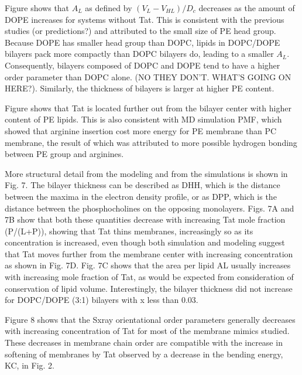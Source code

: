 \documentclass[12pt,letterpaper]{article}
\begin{document}
Figure shows that $A_L$ as defined by $(V_L-V_{HL})/D_c$ decreases as the 
amount of DOPE increases for systems without Tat. This is consistent with the
previous studies (or predictions?) and attributed to the small size of PE
head group. Because DOPE has smaller head group than DOPC, lipids in DOPC/DOPE
bilayers pack more compactly than DOPC bilayers do, leading to a smaller $A_L$.
Consequently, bilayers composed of DOPC and DOPE tend to have a higher order 
parameter than DOPC alone. (NO THEY DON'T. WHAT'S GOING ON HERE?). Similarly,
the thickness of bilayers is larger at higher PE content. 

Figure shows that Tat is located further out from the bilayer center with 
higher content of PE lipids. This is also consistent with MD simulation PMF,
which showed that arginine insertion cost more energy for PE membrane than
PC membrane, the result of which was attributed to more possible hydrogen 
bonding between PE group and arginines.



More structural detail from the modeling and from the simulations is shown in 
Fig. 7. The bilayer thickness can be described as DHH, which is the 
distance between the maxima in the electron density profile, or as DPP, which 
is the distance between the phosphocholines on the opposing monolayers. Figs. 
7A and 7B show that both these quantities decrease with increasing Tat mole 
fraction (P/(L+P)), showing that Tat thins membranes, increasingly so as its 
concentration is increased, even though both simulation and modeling suggest 
that Tat moves further from the membrane center with increasing concentration 
as shown in Fig. 7D.  Fig. 7C shows that the area per lipid AL usually increases 
with increasing mole fraction of Tat, as would be expected from consideration of 
conservation of lipid volume. Interestingly, the bilayer thickness did not 
increase for DOPC/DOPE (3:1) bilayers with x less than 0.03.  

Figure 8 shows that the Sxray orientational order parameters generally 
decreases with increasing concentration of Tat for most of the membrane mimics 
studied.  These decreases in membrane chain order are compatible with the 
increase in softening of membranes by Tat observed by a decrease in the bending
energy, KC, in Fig. 2.



\end{document}
